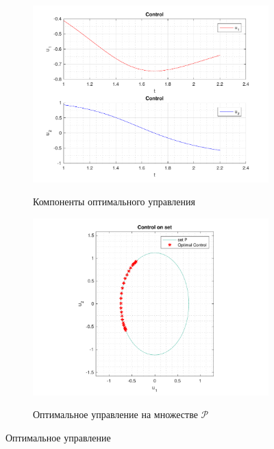 \documentclass[11pt, oneside, final]{article}
\theoremstyle{break}
\numberwithin{equation}{section}
\theoremstyle{plain}
\theoremstyle{definition}
\begin{document}
    \begin{figure}[H]
        \begin{subfigure}{0.5\linewidth}
            \centering
            \includegraphics[width=\linewidth]{s4fig3}
            \label{pic:s4:3}
            \caption{Компоненты оптимального управления}
        \end{subfigure}
        \begin{subfigure}{0.5\linewidth}
            \centering
            \includegraphics[width=\linewidth]{s4fig4}
            \label{pic:s4:4}
            \caption{Оптимальное управление на множестве \(\mathcal{P}\)}
        \end{subfigure}
        \caption{Оптимальное управление}
    \end{figure}
    
\end{document}
